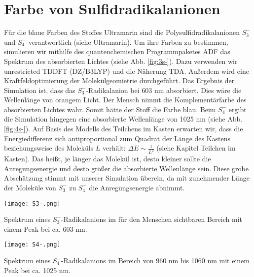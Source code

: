 \section{Farbe von Sulfidradikalanionen}

Für die blaue Farben des Stoffes Ultramarin sind die Polysulfidradikalanionen $S_3 ^{-}$ und $S_4 ^{-}$ verantwortlich (siehe Ultramarin). Um ihre Farben zu bestimmen, simulieren wir mithilfe des quantenchemischen Programmpaketes ADF \cite{ADF} das Spektrum des absorbierten Lichtes (siehe Abb. \ref{fig:3s-}). Dazu verwenden wir unrestricted TDDFT (DZ/B3LYP) und die Näherung TDA. Außerdem wird eine Kraftfeldoptimierung der Molekülgeomietrie durchgeführt. Das Ergebnis der Simulation ist, dass das $S_3^{-}$-Radikalanion bei 603 nm absorbiert. Dies wäre die Wellenlänge von orangem Licht. Der Mensch nimmt die Komplementärfarbe des absorbierten Lichtes wahr. Somit hätte der Stoff die Farbe blau. Beim $S_4^{-}$ ergibt die Simulation hingegen eine absorbierte Wellenlänge von 1025 nm (siehe Abb. \ref{fig:4s-}).
Auf Basis des Modells des Teilchens im Kasten erwarten wir, dass die Energiedifferenz sich antiproportional zum Quadrat der Länge des Kastens beziehungsweise des Moleküls $L$ verhält: $\Delta E \sim \frac{1}{L^2}$ (siehe Kapitel Teilchen im Kasten). Das heißt, je länger das Molekül ist, desto kleiner sollte die Anregungsenergie und desto größer die absorbierte Wellenlänge sein. Diese grobe Abschätzung stimmt mit unserer Simulation überein, da mit zunehmender Länge der Moleküle von $S_3^{-}$ zu $S_4^{-}$ die Anregungsenergie abnimmt.


\begin{dsafigure}
 \centering
 \texttt{[image: S3-.png]}
 \caption{Spektrum eines $S_3^{-}$-Radikalanions im für den Menschen sichtbaren Bereich mit einem Peak bei ca. 603 nm.}
 \label{fig:3s-}
\end{dsafigure}

\begin{dsafigure}
 \centering
 \texttt{[image: S4-.png]}
 \caption{Spektrum eines $S_4^{-}$-Radikalanions im Bereich von 960 nm bis 1060 nm mit einem Peak bei ca. 1025 nm.}
 \label{fig:4s-}
\end{dsafigure}
